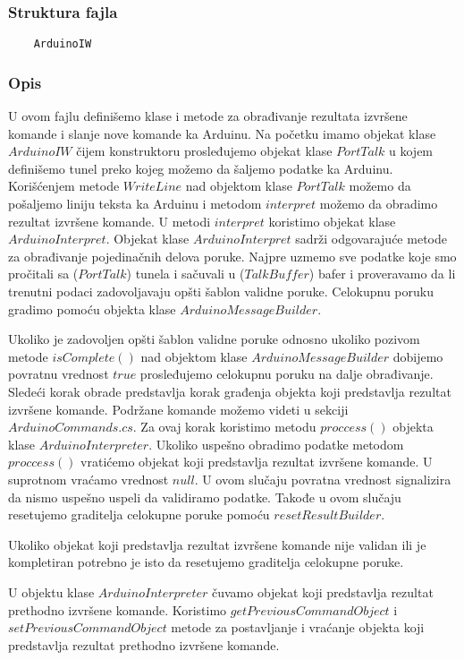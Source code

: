 \documentclass[a4paper]{extarticle}
\begin{document}
	\subsubsection*{Struktura fajla}
	\begin{verbatim}
	ArduinoIW
	\end{verbatim}
	
	\subsubsection*{Opis}
	U ovom fajlu definišemo klase i metode za obrađivanje rezultata izvršene komande i slanje nove komande ka Arduinu. Na početku imamo objekat klase $ArduinoIW$ čijem konstruktoru prosleđujemo objekat klase $PortTalk$ u kojem definišemo tunel preko kojeg možemo da šaljemo podatke ka Arduinu. Korišćenjem metode $WriteLine$ nad objektom klase $PortTalk$ možemo da pošaljemo liniju teksta ka Arduinu i metodom $interpret$ možemo da obradimo rezultat izvršene komande. U metodi $interpret$ koristimo objekat klase $ArduinoInterpret$. Objekat klase $ArduinoInterpret$ sadrži odgovarajuće metode za obrađivanje pojedinačnih delova poruke. 
	Najpre uzmemo sve podatke koje smo pročitali sa ($PortTalk$) tunela  i sačuvali u ($TalkBuffer$) bafer i proveravamo da li trenutni podaci zadovoljavaju opšti šablon validne poruke. Celokupnu poruku gradimo pomoću objekta klase $ArduinoMessageBuilder$.
		
	
	
	Ukoliko je zadovoljen opšti šablon validne poruke odnosno ukoliko pozivom metode $isComplete()$  nad objektom klase $ArduinoMessageBuilder$ dobijemo povratnu vrednost $true$ prosleđujemo celokupnu poruku na dalje obrađivanje. Sledeći korak obrade predstavlja korak građenja objekta koji predstavlja rezultat izvršene komande. Podržane komande možemo videti u sekciji $ArduinoCommands.cs$. Za ovaj korak koristimo metodu $proccess()$ objekta klase $ArduinoInterpreter$. Ukoliko uspešno obradimo podatke metodom $proccess()$ vratićemo objekat koji predstavlja rezultat izvršene komande. U suprotnom vraćamo vrednost $null$. U ovom slučaju  povratna vrednost signalizira da nismo uspešno uspeli  da validiramo podatke. Takođe u ovom slučaju resetujemo graditelja celokupne poruke pomoću $resetResultBuilder$.
	
	Ukoliko objekat koji predstavlja rezultat izvršene komande nije validan ili je kompletiran potrebno je isto da resetujemo graditelja celokupne poruke.
	
	U objektu klase $ArduinoInterpreter$ čuvamo objekat koji predstavlja rezultat prethodno izvršene komande. Koristimo $getPreviousCommandObject$ i\\ $setPreviousCommandObject$ metode za postavljanje i vraćanje objekta koji predstavlja rezultat prethodno izvršene komande.
	
\end{document}
